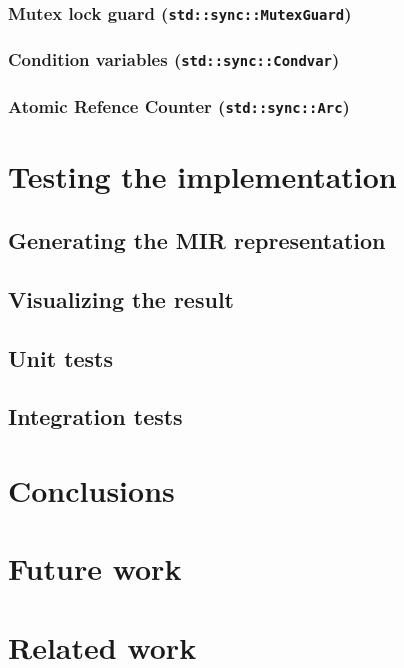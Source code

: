\documentclass[12pt, oneside]{book}
\begin{document}
\subsection{Mutex lock guard (\texttt{std::sync::MutexGuard})}
\subsection{Condition variables (\texttt{std::sync::Condvar})}
\subsection{Atomic Refence Counter (\texttt{std::sync::Arc})}

\chapter{Testing the implementation}

\section{Generating the MIR representation}
\section{Visualizing the result}
\section{Unit tests}
\section{Integration tests}
\label{sec:integration-tests}

\cite{dot2015}
\cite{hillah:hal-01176335}
\cite{jungel2000petri}

\chapter{Conclusions}

\chapter{Future work}
\label{chap:future-work}

\chapter{Related work}


\clearpage


\end{document}
